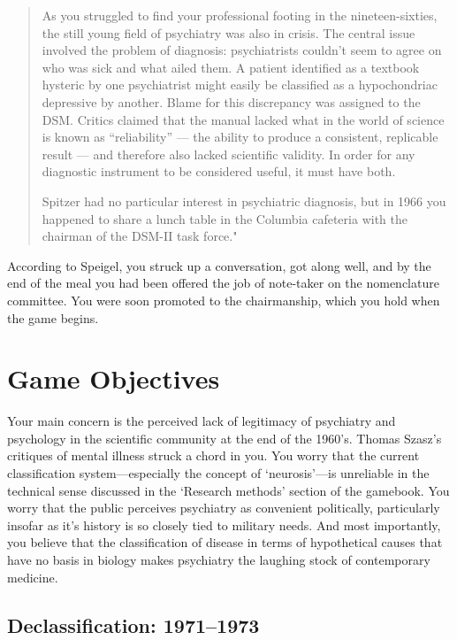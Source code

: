 \begin{quote}
As you struggled to find your professional footing in the nineteen-sixties, the still young field of psychiatry was also in crisis. The central issue involved the problem of diagnosis: psychiatrists couldn't seem to agree on who was sick and what ailed them. A patient identified as a textbook hysteric by one psychiatrist might easily be classified as a hypochondriac depressive by another. Blame for this discrepancy was assigned to the DSM. Critics claimed that the manual lacked what in the world of science is known as ``reliability'' --- the ability to produce a consistent, replicable result --- and therefore also lacked scientific validity. In order for any diagnostic instrument to be considered useful, it must have both.

Spitzer had no particular interest in psychiatric diagnosis, but in 1966 you happened to share a lunch table in the Columbia cafeteria with the chairman of the DSM-II task force."
\end{quote}

According to Speigel, you struck up a conversation, got along well, and by the end of the meal you had been offered the job of note-taker on the nomenclature committee. You were soon promoted to the chairmanship, which you hold when the game begins.

\section{Game Objectives}
\label{gameobjectives}

Your main concern is the perceived lack of legitimacy of psychiatry and psychology in the scientific community at the end of the 1960's. Thomas Szasz's critiques of mental illness struck a chord in you. You worry that the current classification system---especially the concept of `neurosis'---is unreliable in the technical sense discussed in the `Research methods' section of the gamebook. You worry that the public perceives psychiatry as convenient politically, particularly insofar as it's history is so closely tied to military needs. And most importantly, you believe that the classification of disease in terms of hypothetical causes that have no basis in biology makes psychiatry the laughing stock of contemporary medicine.

\subsection{Declassification: 1971--1973}
\label{declassification:1971-1973}

